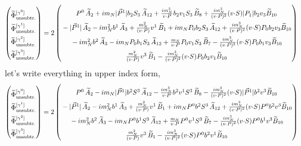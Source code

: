 \documentclass[]{article}
\numberwithin{equation}{section}
\newcommand{\tcdot}{{\cdot}}
\newcommand{\tAmp}{\widetilde{A}}
\newcommand{\tBmp}{\widetilde{B}}
\newcommand{\tAmp}{\ensuremath{\widetilde{A}^{(+)}}}
\newcommand{\tBmp}{\ensuremath{\widetilde{B}^{(+)}}}
\newcommand{\bvec}{b}
\newcommand{\mN}{m_N}
\newcommand{\unsub}{\text{unsubtr.}}
\begin{document}
\begin{align}
    \begin{pmatrix}
        \rule{0pt}{16pt} \widetilde \Phi^{[\gamma^{0}]}_{\unsub}\\
        \rule{0pt}{16pt} \widetilde \Phi^{[\gamma^{1}]}_{\unsub}\\
        \rule{0pt}{16pt} \widetilde \Phi^{[\gamma^{2}]}_{\unsub}\\
        \rule{0pt}{16pt} \widetilde \Phi^{[\gamma^{3}]}_{\unsub}
    \end{pmatrix} &=2\begin{pmatrix}
       \rule{0pt}{16pt}  P^0\, \tAmp_2  + i \mN  |\vec{P}^1| \bvec_2 S_3\, \tAmp_{12}+ \frac{ i \mN^3}{v \tcdot P}  \bvec_2 v_1 S_3\, \tBmp_8+ \frac{i \mN^3}{(v \tcdot P)^2} (v \tcdot S)  |P_1| \bvec_2 v_3 \tBmp_{10}\\
        \rule{0pt}{16pt} -|\vec{P}^1|\, \tAmp_2- i \mN^2 \bvec^1\, \tAmp_3+ \frac{\mN^2}{(v \tcdot P)} v^1\, \tBmp_1 
		+ i \mN  P_0 \bvec_2 S_3\, \tAmp_{12}+ \frac{i \mN^3}{(v \tcdot P)^2} (v \tcdot S)  P_0 \bvec_2 v_3 \tBmp_{10}\\
         \rule{0pt}{16pt} - i \mN^2 \bvec^2\, \tAmp_3
		- i \mN  P_0 \bvec_1 S_3\, \tAmp_{12}+ \frac{\mN}{v \tcdot P}  P_0 v_1 S_3\, \tBmp_7- \frac{i \mN^3}{(v \tcdot P)^2} (v \tcdot S) P_0 \bvec_1 v_3 \tBmp_{10}\\
        \rule{0pt}{16pt} \frac{\mN^2}{(v \tcdot P)} v^3\, \tBmp_1- \frac{i \mN^3}{(v \tcdot P)^2} (v \tcdot S)  P_0 \bvec_2 v_1 \tBmp_{10}
    \end{pmatrix}
\end{align}
let's write everything in upper index form,
\begin{align}
    \begin{pmatrix}
        \rule{0pt}{16pt} \widetilde \Phi^{[\gamma^{0}]}_{\unsub}\\
        \rule{0pt}{16pt} \widetilde \Phi^{[\gamma^{1}]}_{\unsub}\\
        \rule{0pt}{16pt} \widetilde \Phi^{[\gamma^{2}]}_{\unsub}\\
        \rule{0pt}{16pt} \widetilde \Phi^{[\gamma^{3}]}_{\unsub}
    \end{pmatrix} &=2\begin{pmatrix}
       \rule{0pt}{16pt}  P^0\, \tAmp_2  - i \mN  |\vec{P}^1| \bvec^2 S^3\, \tAmp_{12}- \frac{ i \mN^3}{v \tcdot P}  \bvec^2 v^1 S^3\, \tBmp_8- \frac{i \mN^3}{(v \tcdot P)^2} (v \tcdot S)  |\vec{P}^1| \bvec^2 v^3 \tBmp_{10}\\
        \rule{0pt}{16pt} -|\vec{P}^1|\, \tAmp_2- i \mN^2 \bvec^1\, \tAmp_3+ \frac{\mN^2}{(v \tcdot P)} v^1\, \tBmp_1 
		+ i \mN  P^0 \bvec^2 S^3\, \tAmp_{12}+ \frac{i \mN^3}{(v \tcdot P)^2} (v \tcdot S)  P^0 \bvec^2 v^3 \tBmp_{10}\\
         \rule{0pt}{16pt} - i \mN^2 \bvec^2\, \tAmp_3
		- i \mN  P^0 \bvec^1 S^3\, \tAmp_{12}+ \frac{\mN}{v \tcdot P}  P^0 v^1 S^3\, \tBmp_7- \frac{i \mN^3}{(v \tcdot P)^2} (v \tcdot S) P^0 \bvec^1 v^3 \tBmp_{10}\\
        \rule{0pt}{16pt} \frac{\mN^2}{(v \tcdot P)} v^3\, \tBmp_1- \frac{i \mN^3}{(v \tcdot P)^2} (v \tcdot S)  P^0 \bvec^2 v^1 \tBmp_{10}
    \end{pmatrix}
\end{align}
\end{document}
